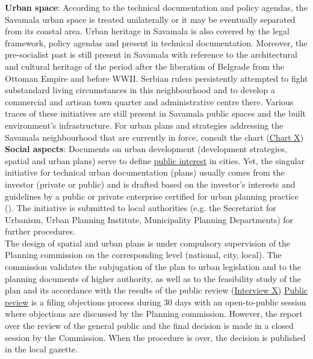 \documentclass[11pt]{report}
\begin{document}
{{{{\begin{itemize}
\textbf{Urban space}:
According to the technical documentation and policy agendas, the Savamala urban space is treated unilaterally or it may be eventually separated from its coastal area. Urban heritage in Savamala is also covered by the legal framework, policy agendas and present in technical documentation. Moreover, the pre-socialist past is still present in Savamala with reference to the architectural and cultural heritage of the period after the liberation of Belgrade from the Ottoman Empire and before WWII. 
Serbian rulers persistently attempted to fight substandard living circumstances in this neighbourhood and to develop a commercial and artisan town quarter and administrative centre there.
Various traces of these initiatives are still present in Savamala public spaces and the built environment’s infrastructure. For urban plans and strategies addressing the Savamala neighbourhood that are currently in force, consult the chart (\href{Chart Planovi CH5}{Chart X}) %
\\

\textbf{Social aspects}:
Documents on urban development (development strategies, spatial and urban plans) serve to define  \underline{public interest} in cities.
Yet, the singular initiative for technical urban documentation (plans) usually comes from the investor (private or public) and is drafted based on the investor's interests and guidelines by a public or private enterprise certified for urban planning practice (\href{ref}{\citealt{ministarstvo_prostora_urbani_2014}}). %
The initiative is submitted to local authorities (e.g. the Secretariat for Urbanism, Urban Planning Institute, Municipality Planning Departments) for further procedures.
\\

The design of spatial and urban plans is under compulsory supervision of the Planning commission on the corresponding level (national, city, local). The commission validates the subjugation of the plan to urban legislation and to the planning documents of higher authority, as well as to the feasibility study of the plan and its accordance with the results of the public review (\href{ref}{Interview X})
\underline{Public review} is a filing objections process during 30 days with an open-to-public session where objections are discussed by the Planning commission. However, the report over the review of the general public and the final decision is made in a closed session by the Commission. 
When the procedure is over, the decision is published in the local gazette.
\\


\end{itemize}}}}}
\end{document}
